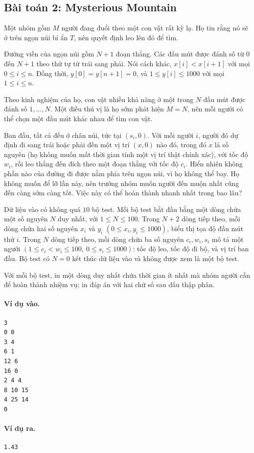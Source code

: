 \documentclass[11pt]{article}
\begin{document}
\subsection{Bài toán 2: Mysterious Mountain}

Một nhóm gồm $M$ người đang đuổi theo một con vật rất kỳ lạ. Họ tin rằng nó
sẽ ở trên ngọn núi bí ẩn $T$, nên quyết định leo lên đó để tìm.

Đường viền của ngọn núi gồm $N+1$ đoạn thẳng. Các đầu mút được đánh số từ
$0$ đến $N+1$ theo thứ tự từ trái sang phải. Nói cách khác,
$x[i]<x[i+1]$ với mọi $0\le i\le n$. Đồng thời,
$y[0]=y[n+1]=0$, và $1\le y[i]\le 1000$ với mọi $1\le i\le n$.

Theo kinh nghiệm của họ, con vật nhiều khả năng ở một trong $N$ đầu mút được
đánh số $1,\ldots,N$. Một điều thú vị là họ sớm phát hiện $M=N$, nên mỗi
người có thể chọn một đầu mút khác nhau để tìm con vật.

Ban đầu, tất cả đều ở chân núi, tức tại $(s_i,0)$. Với mỗi người $i$, người đó
dự định đi sang trái hoặc phải đến một vị trí $(x,0)$ nào đó, trong đó $x$ là
số nguyên (họ không muốn mất thời gian tính một vị trí thật chính xác), với
tốc độ $w_i$, rồi leo thẳng đến đích theo một đoạn thẳng với tốc độ $c_i$.
Hiển nhiên không phần nào của đường đi được nằm phía trên ngọn núi, vì họ
không thể bay. Họ không muốn để lỡ lần này, nên trưởng nhóm muốn người đến
muộn nhất cũng đến càng sớm càng tốt. Việc này có thể hoàn thành nhanh nhất
trong bao lâu?

Dữ liệu vào có không quá $10$ bộ test. Mỗi bộ test bắt đầu bằng một dòng chứa
một số nguyên $N$ duy nhất, với $1\le N\le 100$. Trong $N+2$ dòng tiếp theo,
mỗi dòng chứa hai số nguyên $x_i$ và $y_i$ $(0\le x_i,y_i\le 1000)$, biểu thị
tọa độ đầu mút thứ $i$. Trong $N$ dòng tiếp theo, mỗi dòng chứa ba số nguyên
$c_i,w_i,s_i$ mô tả một người $(1\le c_i<w_i\le 100,\ 0\le s_i\le 1000)$:
tốc độ leo, tốc độ đi bộ, và vị trí ban đầu. Bộ test có $N=0$ kết thúc dữ
liệu vào và không được xem là một bộ test.

Với mỗi bộ test, in một dòng duy nhất chứa thời gian ít nhất mà nhóm người cần
để hoàn thành nhiệm vụ; in đáp án với hai chữ số sau dấu thập phân.

\paragraph{Ví dụ vào.}
\begin{verbatim}
3
0 0
3 4
6 1
12 6
16 0
2 4 4
8 10 15
4 25 14
0
\end{verbatim}

\paragraph{Ví dụ ra.}
\begin{verbatim}
1.43
\end{verbatim}
\end{document}
